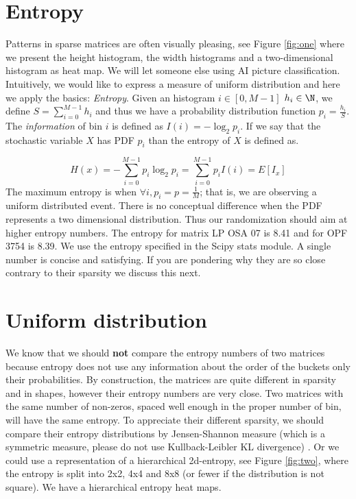 \documentclass[manuscript,screen]{acmart}
\begin{document}
\section{Entropy}
\label{sec:entropy}
Patterns in sparse matrices are often visually pleasing, see Figure
\ref{fig:one} where we present the height histogram, the width
histograms and a two-dimensional histogram as heat map. We will let
someone else using AI picture classification. Intuitively, we would
like to express a measure of uniform distribution and here we apply
the basics: {\em Entropy}. Given an histogram $i\in[0,M-1]$ $h_i \in
\N$, we define $S =\sum_{i=0}^{M-1}h_i$ and thus we have a probability
distribution function $p_i = \frac{h_i}{S}$. The {\em information} of
bin $i$ is defined as $I(i) = -\log_2 p_i$. If we say that the
stochastic variable $X$ has PDF $p_i$ than the entropy of $X$ is
defined as.

\begin{equation}
  \label{eq:entropy}
  H(x) = -\sum_{i=0}^{M-1} p_i\log_2p_i = \sum_{i=0}^{M-1}p_i I(i) =
  E[I_x]
\end{equation}
The maximum entropy is when $\forall i, p_i = p = \frac{1}{M}$; that
is, we are observing a uniform distributed event. There is no
conceptual difference when the PDF represents a two dimensional
distribution. Thus our randomization should aim at higher entropy
numbers. The entropy for matrix LP OSA 07 is 8.41 and for OPF 3754 is
8.39. We use the entropy specified in the Scipy stats module.  A
single number is concise and satisfying. If you are pondering why they
are so close contrary to their sparsity we discuss this next.


\section{Uniform distribution}
\label{sec:uniform}
We know that we should {\bf not} compare the entropy numbers of two
matrices because entropy does not use any information about the order
of the buckets only their probabilities. By construction, the matrices
are quite different in sparsity and in shapes, however their entropy
numbers are very close.  Two matrices with the same number of
non-zeros, spaced well enough in the proper number of bin, will have
the same entropy. To appreciate their different sparsity, we should
compare their entropy distributions by Jensen-Shannon measure (which
is a symmetric measure, please do not use Kullback-Leibler KL
divergence) \cite{dalberto2012nonparametric}. Or we could use a representation of a hierarchical
2d-entropy, see Figure \ref{fig:two}, where the entropy is split into
2x2, 4x4 and 8x8 (or fewer if the distribution is not square). We have
a hierarchical entropy heat maps.
\end{document}
